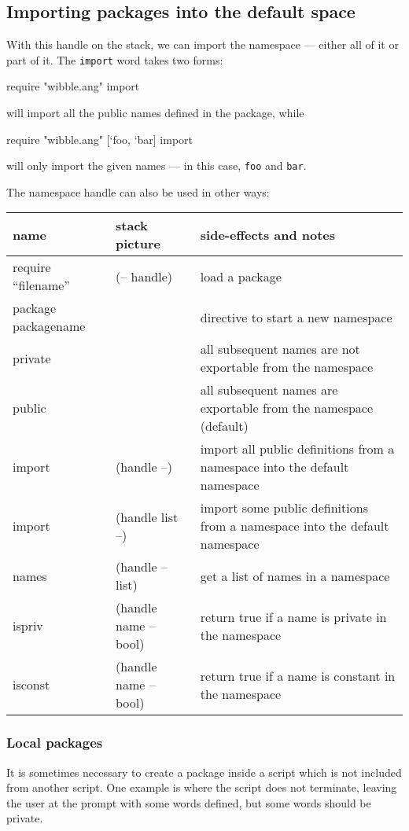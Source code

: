 \subsection{Importing packages into the default space}
With this handle on the stack, we can import the namespace --- either
all of it or part of it. The \texttt{import} word takes two forms:
\begin{v}
require "wibble.ang" import
\end{v}
will import all the public names defined in the package, while
\begin{v}
require "wibble.ang" [`foo, `bar] import
\end{v}
will only import the given names --- in this case, \texttt{foo} and \texttt{bar}.

The namespace handle can also be used in other ways:
\begin{center}
\begin{tabular}{|l|l|p{3in}|}\hline
\textbf{name} & \textbf{stack picture} & \textbf{side-effects and notes}\\ \hline
require ``filename'' & (-- handle) & load a package\\
package packagename & & directive to start a new namespace \\
private & & all subsequent names are not exportable from the namespace\\
public & & all subsequent names are exportable from the namespace (default)\\\hline
import &(handle --) & import all public definitions from a namespace into the default namespace\\
import &(handle list --) & import some public definitions from a namespace into the default namespace\\
names & (handle -- list) & get a list of names in a namespace\\
ispriv & (handle name -- bool) & return true if a name is private in the namespace\\
isconst & (handle name -- bool) & return true if a name is constant in the namespace\\
\hline
\end{tabular}
\end{center}

\subsubsection{Local packages}
It is sometimes necessary to create a package inside a script which
is not included from another script. One example is where the script
does not terminate, leaving the user at the prompt with some words defined,
but some words should be private.

